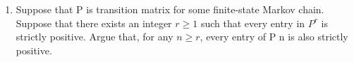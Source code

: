 \documentclass[a4paper]{article}
\begin{document}
\begin{enumerate}
\begin{proof}
\begin{align*}
\begin{pmatrix}
0.3495 \\
0.4027 \\
0.3264
\end{pmatrix}_{k} \\
            &=  \begin{pmatrix} 1 \\ 2 \\ 3 \end{pmatrix}^{T} \cdot \begin{pmatrix}
0.3495 \\
0.4027 \\
0.3264
\end{pmatrix} \\
                                      &= 2.1341 
   .\end{align*}
  \end{proof}
  \item Suppose that P is transition matrix for some finite-state Markov chain. Suppose that there
exists an integer $r \geq 1$ such that every entry in $P^{r}$ is strictly positive. Argue that, for any $n \geq r$,
every entry of P n is also strictly positive.


\end{enumerate}
\end{document}

